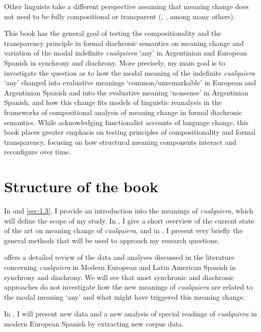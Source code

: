 Other linguists take a different perspective assuming that meaning change does not need to be fully compositional or transparent  (\citealt{CroftCruse2004}, \citealt{DeSmetFischer2017}, among many others).

This book has the general goal of testing the compositionality and the transparency principle in formal diachronic semantics on meaning change and variation of the modal indefinite \textit{cualquiera} ‘any’ in Argentinian and European Spanish in synchrony and diachrony. More precisely, my main goal is to investigate the question as to how the modal meaning of the indefinite \textit{cualquiera} ‘any’ changed into evaluative meanings ‘common/unremarkable’ in European and Argentinian Spanish and into the evaluative meaning ‘nonsense’ in Argentinian Spanish, and how this change fits models of linguistic reanalysis in the frameworks of compositional analysis of meaning change in formal diachronic semantics. While acknowledging functionalist accounts of language change, this book places greater emphasis on testing principles of compositionality and formal transparency, focusing on how structural meaning components interact and reconfigure over time.

\section{Structure of the book} \label{sec:1.1}

In  and \ref{sec:1.3}, I provide an introduction into the meanings of \textit{cualquiera}, which will define the scope of my study. In , I give a short overview of the current state of the art on meaning change of \textit{cualquiera}, and in , I present very briefly the general methods that will be used to approach my research questions.

   offers a detailed review of the data and analyses discussed in the literature concerning \textit{cualquiera} in Modern European and Latin American Spanish in synchrony and diachrony. We will see that most synchronic and diachronic approaches do not investigate how the new meanings of \textit{cualquiera} are related to the modal meaning ‘any’ and what might have triggered this meaning change.

  In , I will present new data and a new analysis of special readings of \textit{cualquiera} in modern European Spanish by extracting new corpus data. %

